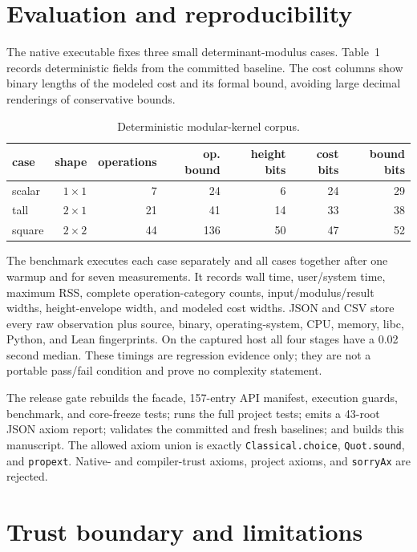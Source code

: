 \documentclass[11pt]{article}
\newcommand{\code}[1]{\texttt{#1}}
\begin{document}
\section{Evaluation and reproducibility}

The native executable fixes three small determinant-modulus cases.  Table~1
records deterministic fields from the committed baseline.  The cost columns
show binary lengths of the modeled cost and its formal bound, avoiding large
decimal renderings of conservative bounds.

\begin{table}[htbp]
\centering
\caption{Deterministic modular-kernel corpus.}
\begin{tabular}{lrrrrrr}
\toprule
case & shape & operations & op. bound & height bits & cost bits & bound bits\\
\midrule
scalar & $1\times1$ & 7  & 24  & 6  & 24 & 29\\
tall   & $2\times1$ & 21 & 41  & 14 & 33 & 38\\
square & $2\times2$ & 44 & 136 & 50 & 47 & 52\\
\bottomrule
\end{tabular}
\end{table}

The benchmark executes each case separately and all cases together after one
warmup and for seven measurements.  It records wall time, user/system time,
maximum RSS, complete operation-category counts, input/modulus/result widths,
height-envelope width, and modeled cost widths.  JSON and CSV store every raw
observation plus source, binary, operating-system, CPU, memory, libc, Python,
and Lean fingerprints.  On the captured host all four stages have a 0.02
second median.  These timings are regression evidence only; they are not a
portable pass/fail condition and prove no complexity statement.

The release gate rebuilds the facade, 157-entry API manifest, execution
guards, benchmark, and core-freeze tests; runs the full project tests; emits a
43-root JSON axiom report; validates the committed and fresh baselines; and
builds this manuscript.  The allowed axiom union is exactly
\code{Classical.choice}, \code{Quot.sound}, and \code{propext}.  Native- and
compiler-trust axioms, project axioms, and \code{sorryAx} are rejected.

\section{Trust boundary and limitations}
\end{document}
